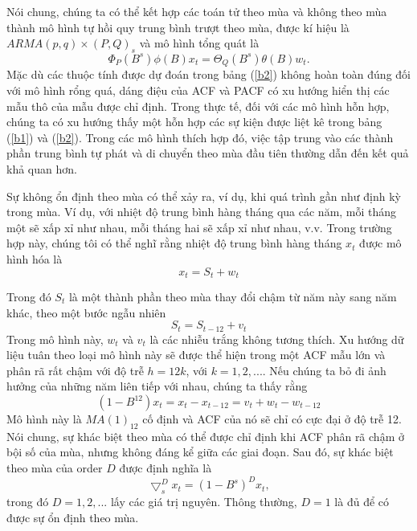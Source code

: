 \documentclass[12pt, a4paper,oneside]{book}
\theoremstyle{definition}
\begin{document}
Nói chung, chúng ta có thể kết hợp các toán tử theo mùa và không theo mùa thành mô hình tự hồi quy trung bình trượt theo mùa, được kí hiệu là $ARMA(p,q)\times(P,Q)_s$ và mô hình tổng quát là
\begin{equation}
\Phi_ {P} (B^{s})\phi(B)x_{t}= \varTheta_{Q}(B^{s})\theta(B)w_{t}. \label{ct1.196}
\end{equation}
Mặc dù các thuộc tính được dự đoán trong bảng (\ref{b2}) không hoàn toàn đúng đối với mô hình rổng quá, dáng điệu của ACF và PACF có xu hướng hiển thị các mẫu thô của mẫu được chỉ định. Trong thực tế, đối với các mô hình hỗn hợp, chúng ta có xu hướng thấy một hỗn hợp các sự kiện được liệt kê trong bảng (\ref{b1}) và (\ref{b2}). Trong các mô hình thích hợp đó, việc tập trung vào các thành phần trung bình tự phát và di chuyển theo mùa đầu tiên thường dẫn đến kết quả khả quan hơn.

Sự không ổn định theo mùa có thể xảy ra, ví dụ, khi quá trình gần như định kỳ trong mùa. Ví dụ, với nhiệt độ trung bình hàng tháng qua các năm, mỗi tháng một sẽ xấp xỉ như nhau, mỗi tháng hai sẽ xấp xỉ như nhau, v.v. Trong trường hợp này, chúng tôi có thể nghĩ rằng nhiệt độ trung bình hàng tháng $x_{t}$ được mô hình hóa là
\begin{equation}
x_{t}=S_{t} +w_{t} \label{ct1.197}
\end{equation}

Trong đó $S_{t}$ là một thành phần theo mùa thay đổi chậm từ năm này sang năm khác, theo một bước ngẫu nhiên
\begin{equation}
 S_{t}=S_{t-12}+ v_{t} \label{ct1.198}
\end{equation}
Trong mô hình này, $w_{t}$ và $v_{t}$ là các nhiễu trắng không tương thích. Xu hướng dữ liệu tuân theo loại mô hình này sẽ được thể hiện trong một ACF mẫu lớn và phân rã rất chậm với độ trễ $h = 12k$, với $k = 1, 2, ....$ Nếu chúng ta bỏ đi ảnh hưởng của những năm liên tiếp với nhau, chúng ta thấy rằng
\begin{equation}
(1-B^{12})x_{t}=x_{t}-x_{t-12}=v_{t}+w_{t}-w_{t-12} \label{ct1.199}
\end{equation}
Mô hình này là $MA(1)_{12}$ cố định và ACF của nó sẽ chỉ có cực đại ở độ trễ 12. Nói chung, sự khác biệt theo mùa có thể được chỉ định khi ACF phân rã chậm ở bội số của mùa, nhưng không đáng kể giữa các giai đoạn. Sau đó, sự khác biệt theo mùa của order $D$ được định nghĩa là
\begin{equation}
\bigtriangledown_{s}^{D}x_{t}=(1-B^{s})^{D}x_{t}, \label{ct1.200}
\end{equation}
trong đó $D = 1, 2, ...$ lấy các giá trị nguyên. Thông thường, $D = 1$ là đủ để có được sự ổn định theo mùa.
\end{document}
